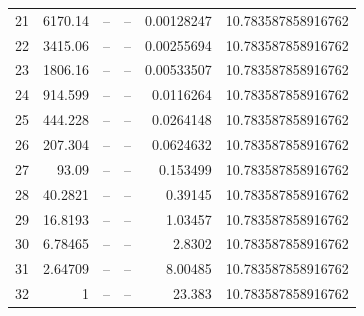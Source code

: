\begin{tabular}{rrrrrr}
21 & 6170.14 & -- & -- & 0.00128247 & 10.783587858916762\\
22 & 3415.06 & -- & -- & 0.00255694 & 10.783587858916762\\
23 & 1806.16 & -- & -- & 0.00533507 & 10.783587858916762\\
24 & 914.599 & -- & -- & 0.0116264 & 10.783587858916762\\
25 & 444.228 & -- & -- & 0.0264148 & 10.783587858916762\\
26 & 207.304 & -- & -- & 0.0624632 & 10.783587858916762\\
27 & 93.09 & -- & -- & 0.153499 & 10.783587858916762\\
28 & 40.2821 & -- & -- & 0.39145 & 10.783587858916762\\
29 & 16.8193 & -- & -- & 1.03457 & 10.783587858916762\\
30 & 6.78465 & -- & -- & 2.8302 & 10.783587858916762\\
31 & 2.64709 & -- & -- & 8.00485 & 10.783587858916762\\
32 & 1 & -- & -- & 23.383 & 10.783587858916762\\
\bottomrule
\end{tabular}
